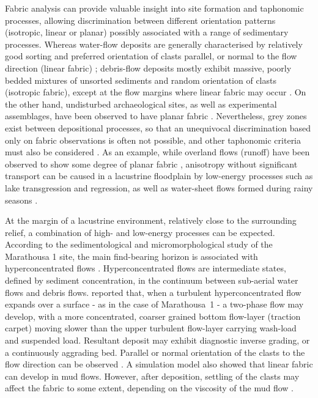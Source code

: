 \documentclass[preprint,authoryear,times]{elsarticle} %
\begin{document}
Fabric analysis can provide valuable insight into site formation and taphonomic processes, allowing discrimination between different orientation patterns (isotropic, linear or planar) possibly associated with a range of sedimentary processes. Whereas water-flow deposits are generally characterised by relatively good sorting and preferred orientation of clasts parallel, or normal to the flow direction (linear fabric) \citep{Petraglia1994}; debris-flow deposits mostly exhibit massive, poorly bedded mixtures of unsorted sediments and random orientation of clasts (isotropic fabric), except at the flow margins where linear fabric may occur \citep{Pierson2005}. On the other hand, undisturbed archaeological sites, as well as experimental assemblages, have been observed to have planar fabric \citep{Bertran1997,Lenoble2004}. Nevertheless, grey zones exist between depositional processes, so that an unequivocal discrimination based only on fabric observations is often not possible, and other taphonomic criteria must also be considered \citep{Lenoble2004}. As an example, while overland flows (runoff) have been observed to show some degree of planar fabric \citep{Lenoble2004}, anisotropy without significant transport can be caused in a lacustrine floodplain by low-energy processes such as lake transgression and regression, as well as water-sheet flows formed during rainy seasons \citep{Cobo-Sanchez2014}. %

At the margin of a lacustrine environment, relatively close to the surrounding relief, a combination of high- and low-energy processes can be expected. According to the sedimentological and micromorphological study of the Marathousa 1 site, the main find-bearing horizon is associated with hyperconcentrated flows \citep{Karkanas}. Hyperconcentrated flows are intermediate states, defined by sediment concentration, in the continuum between sub-aerial water flows and debris flows. \cite{Benvenuti2002} reported that, when a turbulent hyperconcentrated flow expands over a surface - as in the case of Marathousa~1 - a two-phase flow may develop, with a more concentrated, coarser grained bottom flow-layer (traction carpet) moving slower than the upper turbulent flow-layer carrying wash-load and suspended load. Resultant deposit may exhibit diagnostic inverse grading, or a continuously aggrading bed. Parallel or normal orientation of the clasts to the flow direction can be observed \citep{Benvenuti2002}. A simulation model also showed that linear fabric can develop in mud flows. However, after deposition, settling of the clasts may affect the fabric to some extent, depending on the viscosity of the mud flow \citep{Lindsay1968}.
 
\end{document}
